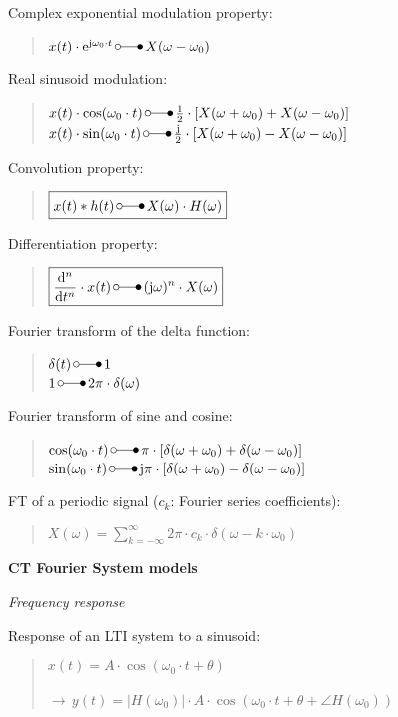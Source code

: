 \documentclass[fontsize=9pt,a4paper,twocolumn]{scrartcl}
\begin{document}
Complex exponential modulation property:
\begin{quote}
	$x(t)\cdot\mathrm{e}^{\mathrm{j}\omega_0\cdot t}\,\laplace\,X(\omega-\omega_0)$
\end{quote}

Real sinusoid modulation:
\begin{quote}
	$x(t)\cdot\cos(\omega_0\cdot t)\,\laplace\,\frac{1}{2}\cdot\left[X(\omega+\omega_0)+X(\omega-\omega_0)\right]$\\
	$x(t)\cdot\sin(\omega_0\cdot t)\,\laplace\,\frac{\mathrm{j}}{2}\cdot\left[X(\omega+\omega_0)-X(\omega-\omega_0)\right]$
\end{quote}

Convolution property:
\begin{quote}
	$\boxed{x(t)*h(t)\,\laplace\,X(\omega)\cdot H(\omega)}$
\end{quote}

Differentiation property:
\begin{quote}
	$\boxed{\frac{\mathrm{d}^n}{\mathrm{d}t^n}\cdot x(t)\,\laplace\,(\mathrm{j}\omega)^n\cdot X(\omega)}$
\end{quote}

Fourier transform of the delta function:
\begin{quote}
	$\delta(t)\,\laplace\,1$\\
	$1\,\laplace\,2\pi\cdot\delta(\omega)$
\end{quote}

Fourier transform of sine and cosine:
\begin{quote}
	$\cos(\omega_0\cdot t)\,\laplace\,\pi\cdot\left[\delta(\omega+\omega_0)+\delta(\omega-\omega_0)\right]$\\
	$\sin(\omega_0\cdot t)\,\laplace\,\mathrm{j}\pi\cdot\left[\delta(\omega+\omega_0)-\delta(\omega-\omega_0)\right]$
\end{quote}
\newpage
FT of a periodic signal ($c_k$: Fourier series coefficients):
\begin{quote}
	$\boxed{X(\omega)=\sum_{k=-\infty}^\infty 2\pi\cdot c_k\cdot\delta(\omega-k\cdot\omega_0)}$
\end{quote}

\large{\textbf{CT Fourier System models}}

\textit{Frequency response}


Response of an LTI system to a sinusoid:
\begin{quote}
	$\boxed{x(t)=A\cdot\cos(\omega_0\cdot t+\theta)}$\\\\
	$\boxed{\to\,y(t)=|H(\omega_0)|\cdot A\cdot\cos\left(\omega_0\cdot t+\theta+\angle  H(\omega_0)\right)}$
\end{quote}
\end{document}
